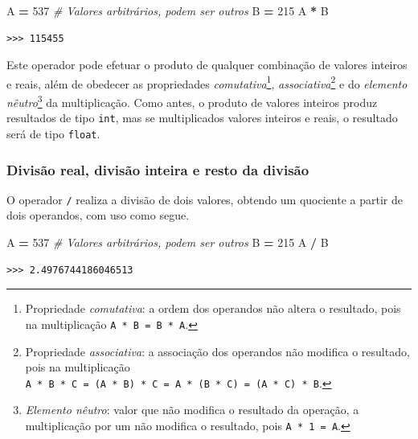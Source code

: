\documentclass[
]{book}
\newenvironment{Shaded}{\begin{snugshade}}{\end{snugshade}}
\newcommand{\CommentTok}[1]{\textcolor[rgb]{0.56,0.35,0.01}{\textit{#1}}}
\newcommand{\DecValTok}[1]{\textcolor[rgb]{0.00,0.00,0.81}{#1}}
\newcommand{\NormalTok}[1]{#1}
\newcommand{\OperatorTok}[1]{\textcolor[rgb]{0.81,0.36,0.00}{\textbf{#1}}}
\begin{document}
\begin{Shaded}
\begin{Highlighting}[]
\NormalTok{A }\OperatorTok{=} \DecValTok{537} \CommentTok{\# Valores arbitrários, podem ser outros}
\NormalTok{B }\OperatorTok{=} \DecValTok{215}
\NormalTok{A }\OperatorTok{*}\NormalTok{ B}
\end{Highlighting}
\end{Shaded}

\begin{verbatim}
>>> 115455
\end{verbatim}

Este operador pode efetuar o produto de qualquer combinação de valores inteiros e reais, além de obedecer as propriedades \emph{comutativa}\footnote{Propriedade \emph{comutativa}: a ordem dos operandos não altera o resultado, pois na multiplicação
  \texttt{A\ *\ B\ =\ B\ *\ A}.}, \emph{associativa}\footnote{Propriedade \emph{associativa}: a associação dos operandos não modifica o resultado, pois na multiplicação
  \texttt{A\ *\ B\ *\ C\ =\ (A\ *\ B)\ *\ C\ =\ A\ *\ (B\ *\ C)\ =\ (A\ *\ C)\ *\ B}.} e do \emph{elemento nêutro}\footnote{\emph{Elemento nêutro}: valor que não modifica o resultado da operação, a multiplicação por um não modifica o resultado, pois \texttt{A\ *\ 1\ =\ A}.} da multiplicação. Como antes, o produto de valores inteiros produz resultados de tipo \texttt{int}, mas se multiplicados valores inteiros e reais, o resultado será de tipo \texttt{float}.

\hypertarget{divisuxe3o-real-divisuxe3o-inteira-e-resto-da-divisuxe3o}{%
\subsubsection{Divisão real, divisão inteira e resto da divisão}\label{divisuxe3o-real-divisuxe3o-inteira-e-resto-da-divisuxe3o}}

O operador \texttt{/} realiza a divisão de dois valores, obtendo um quociente a partir de dois operandos, com uso como segue.

\begin{Shaded}
\begin{Highlighting}[]
\NormalTok{A }\OperatorTok{=} \DecValTok{537} \CommentTok{\# Valores arbitrários, podem ser outros}
\NormalTok{B }\OperatorTok{=} \DecValTok{215}
\NormalTok{A }\OperatorTok{/}\NormalTok{ B}
\end{Highlighting}
\end{Shaded}

\begin{verbatim}
>>> 2.4976744186046513
\end{verbatim}
\end{document}

